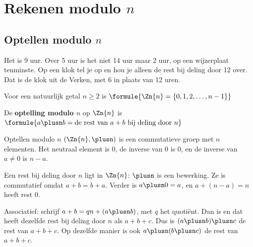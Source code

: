 \begin{oefeningen}
\end{oefeningen}

\section{Rekenen modulo \texorpdfstring{$n$}{n}}

\subsection{Optellen modulo \texorpdfstring{$n$}{n}}

Het is 9 uur. Over 5 uur is het niet 14 uur maar 2 uur, op een wijzerplaat tenminste. Op een klok tel je op en hou je alleen de rest bij deling door 12 over. Dat is de klok uit de Verken, met 6 in plaats van 12 uren.

\begin{theorie}
Voor een natuurlijk getal $n \geqslant 2$ is \quad $\formule{\Zn{n} = \{0, 1, 2, \ldots, n - 1\}}$

\vspace{1mm}
De \textbf{\textcolor{accent}{optelling modulo $n$}} op $\Zn{n}$ is \quad $\formule{a \plusn b = \text{de rest van } a + b \text{ bij deling door } n}$

\begin{stelling}{Optellen modulo $n$}
$(\Zn{n}, \plusn)$ is een commutatieve groep met $n$ elementen. Het neutraal element is 0, de inverse van 0 is 0, en de inverse van $a \neq 0$ is $n - a$.
\end{stelling}

\begin{bewijs}
Een rest bij deling door $n$ ligt in $\Zn{n}$: $\plusn$ is een bewerking. Ze is commutatief omdat $a + b = b + a$. Verder is $a \plusn 0 = a$, en $a + (n - a) = n$ heeft rest 0.

Associatief: schrijf $a + b = qn + (a \plusn b)$, met $q$ het quotiënt. Dan is
en dat heeft dezelfde rest bij deling door $n$ als $a + b + c$. Dus is $(a \plusn b) \plusn c$ de rest van $a + b + c$. Op dezelfde manier is ook $a \plusn (b \plusn c)$ de rest van $a + b + c$.
\end{bewijs}
\end{theorie}

